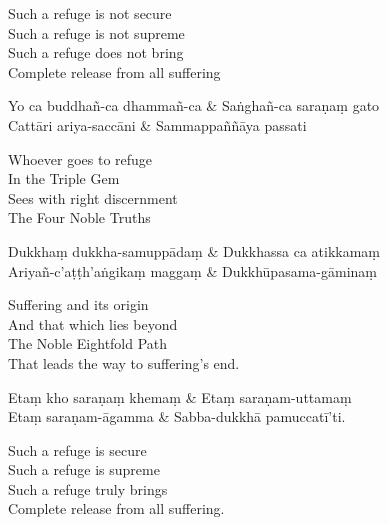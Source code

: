 \begin{english}
  Such a refuge is not secure\\
  Such a refuge is not supreme\\
  Such a refuge does not bring\\
  Complete release from all suffering
\end{english}

\begin{twochants}
  Yo ca buddhañ-ca dhammañ-ca & Saṅghañ-ca saraṇaṃ gato\\
  Cattāri ariya-saccāni & Sammappaññāya passati\\
\end{twochants}

\begin{english}
  Whoever goes to refuge\\
  In the Triple Gem\\
  Sees with right discernment\\
  The Four Noble Truths
\end{english}

\begin{twochants}
  Dukkhaṃ dukkha-samuppādaṃ & Dukkhassa ca atikkamaṃ\\
  Ariyañ-c'aṭṭh'aṅgikaṃ maggaṃ & Dukkhūpasama-gāminaṃ\\
\end{twochants}

\begin{english}
  Suffering and its origin\\
  And that which lies beyond\\
  The Noble Eightfold Path\\
  That leads the way to suffering's end.
\end{english}

\begin{twochants}
  Etaṃ kho saraṇaṃ khemaṃ & Etaṃ saraṇam-uttamaṃ\\
  Etaṃ saraṇam-āgamma & Sabba-dukkhā pamuccatī'ti.
\end{twochants}

\begin{english}
  Such a refuge is secure\\
  Such a refuge is supreme\\
  Such a refuge truly brings\\
  Complete release from all suffering.
\end{english}


